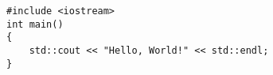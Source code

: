 \documentclass{ctexart}
\begin{document}
     
{\setmainfont{Courier New Bold}                          %
\begin{lstlisting}
#include <iostream>
int main()
{
    std::cout << "Hello, World!" << std::endl;
}  
\end{lstlisting}}
\end{document}
